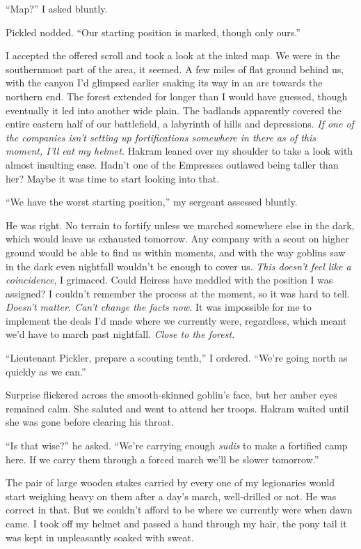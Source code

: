\documentclass[12pt, openany]{book}
\begin{document}
“Map?” I asked bluntly.

Pickled nodded. “Our starting position is marked, though only ours.”

I accepted the offered scroll and took a look at the inked map. We were in the southernmost part of the area, it seemed. A few miles of flat ground behind us, with the canyon I’d glimpsed earlier snaking its way in an arc towards the northern end. The forest extended for longer than I would have guessed, though eventually it led into another wide plain. The badlands apparently covered the entire eastern half of our battlefield, a labyrinth of hills and depressions. \textit{If one of the companies isn’t setting up fortifications somewhere in there as of this moment, I’ll eat my helmet.} Hakram leaned over my shoulder to take a look with almost insulting ease. Hadn’t one of the Empresses outlawed being taller than her? Maybe it was time to start looking into that.

“We have the worst starting position,” my sergeant assessed bluntly.

He was right. No terrain to fortify unless we marched somewhere else in the dark, which would leave us exhausted tomorrow. Any company with a scout on higher ground would be able to find us within moments, and with the way goblins saw in the dark even nightfall wouldn’t be enough to cover us. \textit{This doesn’t feel like a coincidence}, I grimaced. Could Heiress have meddled with the position I was assigned? I couldn’t remember the process at the moment, so it was hard to tell. \textit{Doesn’t matter. Can’t change the facts now.} It was impossible for me to implement the deals I’d made where we currently were, regardless, which meant we’d have to march past nightfall. \textit{Close to the forest. }

“Lieutenant Pickler, prepare a scouting tenth,” I ordered. “We’re going north as quickly as we can.”

Surprise flickered across the smooth-skinned goblin’s face, but her amber eyes remained calm. She saluted and went to attend her troops. Hakram waited until she was gone before clearing his throat.

“Is that wise?” he asked. “We’re carrying enough \textit{sudis} to make a fortified camp here. If we carry them through a forced march we’ll be slower tomorrow.”

The pair of large wooden stakes carried by every one of my legionaries would start weighing heavy on them after a day’s march, well-drilled or not. He was correct in that. But we couldn’t afford to be where we currently were when dawn came. I took off my helmet and passed a hand through my hair, the pony tail it was kept in unpleasantly soaked with sweat.
\end{document}
